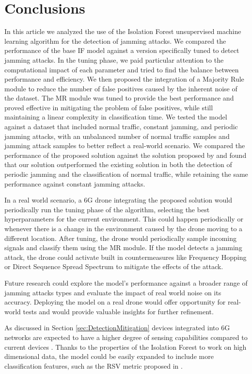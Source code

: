 \documentclass[futureinternet,article,submit,pdftex,moreauthors]{Definitions/mdpi}
\begin{document}
\section{Conclusions}

In this article we analyzed the use of the Isolation Forest unsupervised machine learning algorithm for the detection of jamming attacks. We compared the performance of the base IF model against a version specifically tuned to detect jamming attacks. In the tuning phase, we paid particular attention to the computational impact of each parameter and tried to find the balance between performance and efficiency. 
We then proposed the integration of a Majority Rule module to reduce the number of false positives caused by the inherent noise of the dataset. The MR module was tuned to provide the best performance and proved effective in mitigating the problem of false positives, while still maintaining a linear complexity in classification time.
We tested the model against a dataset that included normal traffic, constant jamming, and periodic jamming attacks, with an unbalanced number of normal traffic samples and jamming attack samples to better reflect a real-world scenario.
We compared the performance of the proposed solution against the solution proposed by \cite{JammingDetectionIoT-Hussain} and found that our solution outperformed the existing solution in both the detection of periodic jamming and the classification of normal traffic, while retaining the same performance against constant jamming attacks.


In a real world scenario, a 6G drone integrating the proposed solution would periodically run the tuning phase of the algorithm, selecting the best hyperparameters for the current environment. This could happen periodically or whenever there is a change in the environment caused by the drone moving to a different location. 
After tuning, the drone would periodically sample incoming signals and classify them using the MR module. If the model detects a jamming attack, the drone could activate built in countermeasures like Frequency Hopping or Direct Sequence Spread Spectrum  to mitigate the effects of the attack. 

Future research could explore the model's performance against a broader range of jamming attacks types and evaluate the impact of real world noise on its accuracy.
Deploying the model on a real drone would offer opportunity for real-world tests and would provide valuable insights for further refinement.

As discussed in Section \ref{sec:DetectionMitigation} devices integrated into 6G networks are expected to have a higher degree of sensing capabilities compared to current devices \cite{6GRoadmapLetaief}. Thanks to the properties of the Isolation Forest to work on high dimensional data, the model could be easily expanded to include more classification features, such as the RSV metric proposed in \cite{JammingDetection-Karagiannis}.
\end{document}
